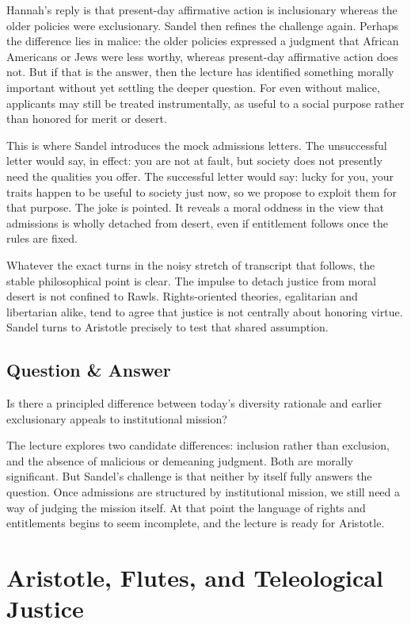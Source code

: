 Hannah's reply is that present-day affirmative action is inclusionary whereas the older policies were exclusionary. Sandel then refines the challenge again. Perhaps the difference lies in malice: the older policies expressed a judgment that African Americans or Jews were less worthy, whereas present-day affirmative action does not. But if that is the answer, then the lecture has identified something morally important without yet settling the deeper question. For even without malice, applicants may still be treated instrumentally, as useful to a social purpose rather than honored for merit or desert.

This is where Sandel introduces the mock admissions letters. The unsuccessful letter would say, in effect: you are not at fault, but society does not presently need the qualities you offer. The successful letter would say: lucky for you, your traits happen to be useful to society just now, so we propose to exploit them for that purpose. The joke is pointed. It reveals a moral oddness in the view that admissions is wholly detached from desert, even if entitlement follows once the rules are fixed.

Whatever the exact turns in the noisy stretch of transcript that follows, the stable philosophical point is clear. The impulse to detach justice from moral desert is not confined to Rawls. Rights-oriented theories, egalitarian and libertarian alike, tend to agree that justice is not centrally about honoring virtue. Sandel turns to Aristotle precisely to test that shared assumption.

\subsection{Question \& Answer}

Is there a principled difference between today's diversity rationale and earlier exclusionary appeals to institutional mission?

The lecture explores two candidate differences: inclusion rather than exclusion, and the absence of malicious or demeaning judgment. Both are morally significant. But Sandel's challenge is that neither by itself fully answers the question. Once admissions are structured by institutional mission, we still need a way of judging the mission itself. At that point the language of rights and entitlements begins to seem incomplete, and the lecture is ready for Aristotle.

\section{Aristotle, Flutes, and Teleological Justice}

